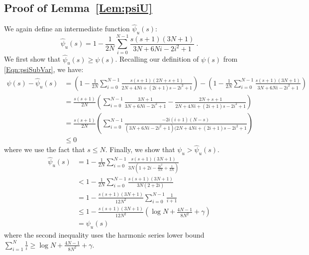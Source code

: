 \documentclass[11pt]{article}
\numberwithin{equation}{section}
\theoremstyle{definition}
\theoremstyle{definition}
\theoremstyle{definition}
\newcommand{\1}{\mathbf{1}}
\newcommand{\psiU}{\psi_{u}}
\newcommand{\psiUHat}{\hat{\psi}_u}
\newcommand{\harmonicLowerBd}{\log N + \frac{4N-1}{8N^2} + \gamma}
\newcommand{\subVar}{s}
\begin{document}
\subsection{Proof of Lemma~\ref{Lem:psiU}}
    We again define an intermediate function $\psiUHat(\subVar)$:
    \begin{equation*}
        \psiUHat(\subVar) = 1-\frac{1}{2N}\sum_{i=0}^{N-1} \frac{\subVar(\subVar+1)(3N+1)}{3N+6Ni-2i^2+1} \ .
    \end{equation*}
    We first show that $\psiUHat(\subVar) \geq \psi(\subVar)$. Recalling our definition of $\psi(s)$ from \eqref{Eqn:psiSubVar}, we have:
    \begin{align*}
            \psi(\subVar) - \psiUHat(\subVar) &= \left(1 - \frac{1}{2N}\sum_{i=0}^{N-1} \frac{\subVar(\subVar+1)(2N+\subVar+1)}{2N+4Ni+(2i+1)\subVar-2i^2+1}\right) - \left(1-\frac{1}{2N}\sum_{i=0}^{N-1} \frac{\subVar(\subVar+1)(3N+1)}{3N+6Ni-2i^2+1}\right) \\
            & = \frac{\subVar(\subVar+1)}{2N} \left( \sum_{i=0}^{N-1} \frac{3N+1}{3N+6Ni-2i^2+1} - \frac{2N+\subVar+1}{2N+4Ni+(2i+1)\subVar-2i^2+1}\right) \\
            & = \frac{\subVar(\subVar+1)}{2N} \left( \sum_{i=0}^{N-1} \frac{-2i(i+1)(N-\subVar)}{(3N+6Ni-2i^2+1)(2N+4Ni+(2i+1)\subVar-2i^2+1}\right) \\
            & \leq 0
    \end{align*}
    where we use the fact that $s \leq N$.
    Finally, we show that $\psiU > \psiUHat(\subVar)$.
    \begin{align*}
        \psiUHat(\subVar) & = 1 - \frac{1}{2N}\sum_{i=0}^{N-1}\frac{\subVar(\subVar+1)(3N+1)}{3N(1+2i-\frac{2i^2}{3N}+\frac{1}{3N})} \\
        & < 1 - \frac{1}{2N}\sum_{i=0}^{N-1}\frac{\subVar(\subVar+1)(3N+1)}{3N(2+2i)} \\
        & = 1-\frac{\subVar(\subVar+1)(3N+1)}{12N^2}\sum_{i=0}^{N-1}\frac{1}{i+1} \\
        & \leq 1-\frac{\subVar(\subVar+1)(3N+1)}{12N^2}\left( \harmonicLowerBd \right) \\
        & = \psiU(\subVar) 
    \end{align*}
    where the second inequality uses the harmonic series lower bound $\sum_{i=1}^N \frac{1}{i} \geq \harmonicLowerBd$.
\end{document}
